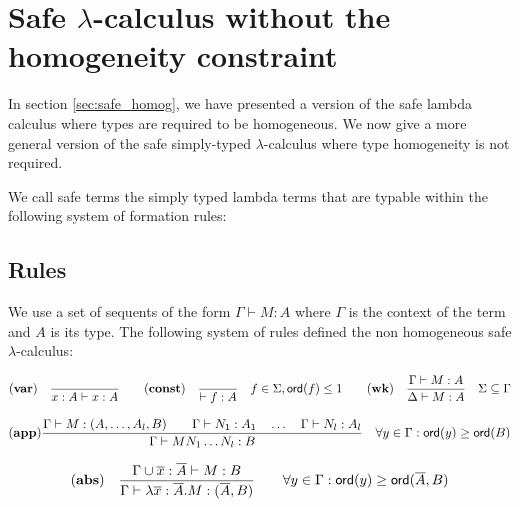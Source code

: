 \clearpage

\section{Safe $\lambda$-calculus without the homogeneity constraint}
\label{sec:safe_nonhomog}


In section \ref{sec:safe_homog}, we have presented a version of the
safe lambda calculus where types are required to be homogeneous. We
now give a more general version of the safe simply-typed
$\lambda$-calculus where type homogeneity is not required.

We call safe terms the simply typed lambda terms that are
typable within the following system of formation rules:

\subsection{Rules}

We use a set of sequents of the form $\Gamma \vdash M : A$ where $\Gamma$ is the context of the term and $A$ is its type.
The following system of rules defined the non homogeneous safe $\lambda$-calculus:

$$ \mathbf{(var)} \quad  \frac{\displaystyle }{x : A\vdash x : A}
\qquad  \mathbf{(const)} \quad  \frac{\displaystyle }{\vdash f : A} \quad f \in \Sigma, {\sf ord}(f) \leq 1
\qquad  \mathbf{(wk)} \quad  \frac{\displaystyle \Gamma \vdash M : A}{\Delta \vdash M : A} \quad \Sigma \subseteq \Gamma$$

$$ \mathbf{(app)} \frac{\displaystyle \Gamma \vdash M : (A,\ldots,A_l,B)
                                        \qquad \Gamma \vdash N_1 : A_1
                                        \quad \ldots \quad \Gamma \vdash N_l : A_l  }{\Gamma  \vdash M N_1 \ldots N_l : B}
                                    \quad
                                   \forall y \in \Gamma : {\sf ord}(y) \geq {\sf ord}(B)$$

$$ \mathbf{(abs)} \quad  \frac{\displaystyle \Gamma \cup \overline{x} : \overline{A} \vdash M : B}{\Gamma  \vdash \lambda \overline{x} : \overline{A} . M : (\overline{A},B)} \qquad
                                   \forall y \in \Gamma : {\sf ord}(y) \geq {\sf ord}(\overline{A},B)$$


